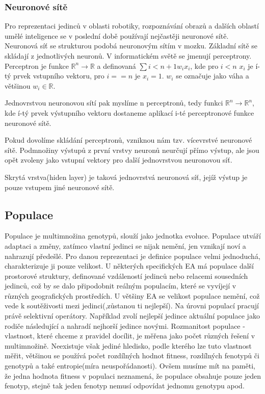 \subsubsection{Neuronové sítě} Pro reprezentaci jedinců v oblasti robotiky, rozpoznávání obrazů a dalších oblastí umělé inteligence se v poslední době používají nejčastěji neuronové sítě. Neuronová síť se strukturou podobá neuronovým sítím v mozku. Základní sítě se skládají z jednotlivých neuronů. V informatickém světě se jmenují perceptrony. Perceptron je funkce $\mathbb{R}^n \rightarrow \mathbb{R}$ a definovaná $\sum{i < n+1} w_{i} x_{i}$, kde pro $i < n$ $x_{i}$ je í-tý prvek vstupního vektoru, pro  $i == n$ je $x_{i}=1$. $w_{i}$ se označuje jako váha a většinou $w_{i} \in \mathbb{R}$. \par
Jednovrstvou neuronovou sítí pak myslíme n perceptronů, tedy funkci $\mathbb{R}^{n} \rightarrow \mathbb{R}^{n}$, kde í-tý prvek výstupního vektoru dostaneme aplikací i-té perceptronové funkce neuronové sítě. \par 
Pokud dovolíme skládání perceptronů, vzniknou nám tzv. vícevrstvé neuronové sítě. Podmnožiny výstupů z první vrstvy neuronů neurčují přímo výstup, ale jsou opět zvoleny jako vstupní vektory pro další jednovrstvou neuronovou síť. \par
Skrytá vrstva(hiden layer) je taková jednovrstvá neuronová síť, jejíž výstup je pouze vstupem jiné neuronové sítě. \par
\subsection{Populace}
Populace je multimnožina genotypů, slouží jako jednotka evoluce. Populace utváří adaptaci a změny, zatímco vlastní jedinci se nijak nemění, jen vznikají noví a nahrazují předešlé. Pro danou reprezentaci je definice populace velmi jednoduchá, charakterizuje ji pouze velikost. U některých specifických EA má populace další prostorové struktury, definované vzdáleností jedinců nebo relacemi sousedních jedinců, což by se dalo připodobnit reálným populacím, které se vyvíjejí v různých geografických prostředích. U většiny EA se velikost populace nemění, což vede k soutěživosti mezi jedinci(,zůstanou ti nejlepší). Na úrovni populací pracují právě selektivní operátory. Například zvolí nejlepší jedince aktuální populace jako rodiče následující a nahradí nejhorší jedince novými. Rozmanitost populace - vlastnost, které chceme z pravidel docílit, je měřena jako počet různých řešení v multimnožině. Neexistuje však jediné hledisko, podle kterého lze tuto vlastnost měřit, většinou se používá počet rozdílných hodnot fitness, rozdílných fenotypů či genotypů a také entropie(míra neuspořádanosti). Ovšem musíme mít na paměti, že jedna hodnota fitness v populaci neznamená, že populace obsahuje pouze jeden fenotyp, stejně tak jeden fenotyp nemusí odpovídat jednomu genotypu apod. 
